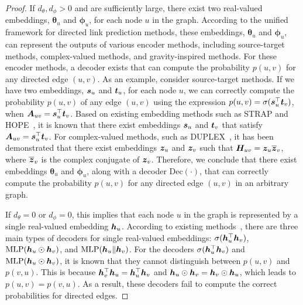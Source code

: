 \begin{proof}
If ${d_{\theta}}, {d_{\phi}} > 0$ and are sufficiently large, there exist two real-valued embeddings, ${\bm \theta}_u$ and ${\bm \phi}_u$, for each node \( u \) in the graph. According to the unified framework for directed link prediction methods, these embeddings, ${\bm \theta}_u$ and ${\bm \phi}_u$, can represent the outputs of various encoder methods, including source-target methods, complex-valued methods, and gravity-inspired methods. For these encoder methods, a decoder exists that can compute the probability \( p(u, v) \) for any directed edge \( (u, v) \).
As an example, consider source-target methods. If we have two embeddings, \( {\bm{s}}_u \) and \( {\bm{t}}_u \), for each node \( u \), we can correctly compute the probability \( p(u, v) \) of any edge \( (u, v) \) using the expression \( p(u, v) = \sigma({\bm{s}}_u^{\top} {\bm{t}}_v) \), when \( {\bm{A}}_{uv} = {\bm{s}}_u^{\top} {\bm{t}}_v \). Based on existing embedding methods such as STRAP and HOPE~\cite{strap,hope}, it is known that there exist embeddings \( {\bm{s}}_u \) and \( {\bm{t}}_v \) that satisfy \( {\bm{A}}_{uv} = {\bm{s}}_u^{\top} {\bm{t}}_v \).
For complex-valued methods, such as DUPLEX~\cite{duplex}, it has been demonstrated that there exist embeddings \( {\bm{z}}_u \) and \( {\bm{z}}_v \) such that \( {\bm{H}}_{uv} = {\bm{z}}_u \overline{{\bm{z}}}_v \), where \( \overline{{\bm{z}}}_v \) is the complex conjugate of \( {\bm{z}}_v \).
Therefore, we conclude that there exist embeddings \( {\bm \theta}_u \) and \( {\bm \phi}_u \), along with a decoder \( \mathrm{Dec}(\cdot) \), that can correctly compute the probability \( p(u, v) \) for any directed edge \( (u, v) \) in an arbitrary graph.


If ${d_{\theta}} = 0$ or ${d_{\phi}} = 0$, this implies that each node $u$ in the graph is represented by a single real-valued embedding ${\bm{h}}_u$. According to existing methods~\cite{magnet,dpyg}, there are three main types of decoders for single real-valued embeddings: 
$\sigma({\bm{h}}_u^{\top}{\bm{h}}_v)$, $\mathrm{MLP}({\bm{h}}_u \odot {\bm{h}}_v)$, and $\mathrm{MLP}({\bm{h}}_u \| {\bm{h}}_v)$.
For the decoders $\sigma({\bm{h}}_u^{\top}{\bm{h}}_v)$ and $\mathrm{MLP}({\bm{h}}_u \odot {\bm{h}}_v)$, it is known that they cannot distinguish between $p(u,v)$ and $p(v,u)$. This is because 
$ {\bm{h}}_v^{\top}{\bm{h}}_u = {\bm{h}}_u^{\top}{\bm{h}}_v$ and ${\bm{h}}_u \odot {\bm{h}}_v = {\bm{h}}_v \odot {\bm{h}}_u$,
which leads to $p(u,v) = p(v,u)$. As a result, these decoders fail to compute the correct probabilities for directed edges.


\end{proof}

